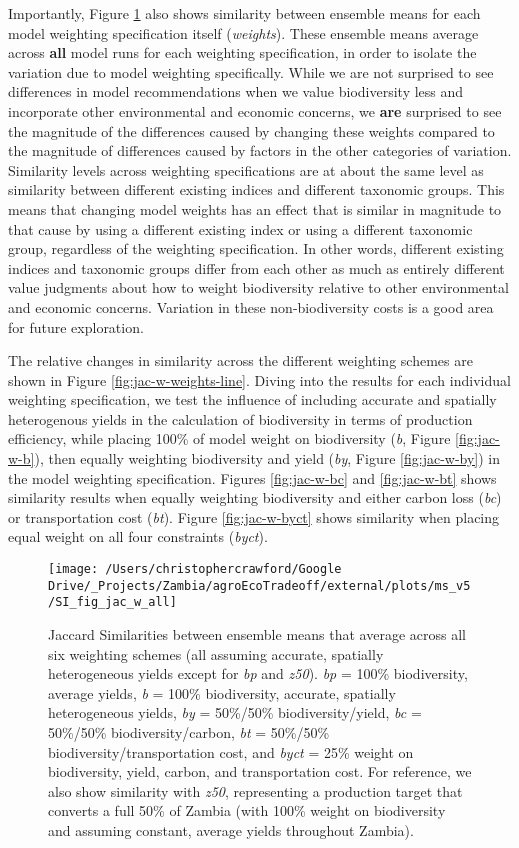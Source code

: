 \documentclass[
]{article}
\begin{document}
Importantly, Figure \ref{fig:jac-w-all} also shows similarity between ensemble means for each model weighting specification itself (\emph{weights}). These ensemble means average across \textbf{all} model runs for each weighting specification, in order to isolate the variation due to model weighting specifically. While we are not surprised to see differences in model recommendations when we value biodiversity less and incorporate other environmental and economic concerns, we \textbf{are} surprised to see the magnitude of the differences caused by changing these weights compared to the magnitude of differences caused by factors in the other categories of variation. Similarity levels across weighting specifications are at about the same level as similarity between different existing indices and different taxonomic groups. This means that changing model weights has an effect that is similar in magnitude to that cause by using a different existing index or using a different taxonomic group, regardless of the weighting specification. In other words, different existing indices and taxonomic groups differ from each other as much as entirely different value judgments about how to weight biodiversity relative to other environmental and economic concerns. Variation in these non-biodiversity costs is a good area for future exploration.

The relative changes in similarity across the different weighting schemes are shown in Figure \ref{fig:jac-w-weights-line}. Diving into the results for each individual weighting specification, we test the influence of including accurate and spatially heterogenous yields in the calculation of biodiversity in terms of production efficiency, while placing 100\% of model weight on biodiversity (\emph{b}, Figure \ref{fig:jac-w-b}), then equally weighting biodiversity and yield (\emph{by}, Figure \ref{fig:jac-w-by}) in the model weighting specification. Figures \ref{fig:jac-w-bc} and \ref{fig:jac-w-bt} shows similarity results when equally weighting biodiversity and either carbon loss (\emph{bc}) or transportation cost (\emph{bt}). Figure \ref{fig:jac-w-byct} shows similarity when placing equal weight on all four constraints (\emph{byct}).

\begin{figure}
\texttt{[image: /Users/christophercrawford/Google Drive/\_Projects/Zambia/agroEcoTradeoff/external/plots/ms\_v5/SI\_fig\_jac\_w\_all]} \caption{Jaccard Similarities between ensemble means that average across all six weighting schemes (all assuming accurate, spatially heterogeneous yields except for \emph{bp} and \emph{z50}). \emph{bp} = 100\% biodiversity, average yields, \emph{b} = 100\% biodiversity, accurate, spatially heterogeneous yields, \emph{by} = 50\%/50\% biodiversity/yield, \emph{bc} = 50\%/50\% biodiversity/carbon, \emph{bt} = 50\%/50\% biodiversity/transportation cost, and \emph{byct} = 25\% weight on biodiversity, yield, carbon, and transportation cost. For reference, we also show similarity with \emph{z50}, representing a production target that converts a full 50\% of Zambia (with 100\% weight on biodiversity and assuming constant, average yields throughout Zambia).}\label{fig:jac-w-all}
\end{figure}
\end{document}
